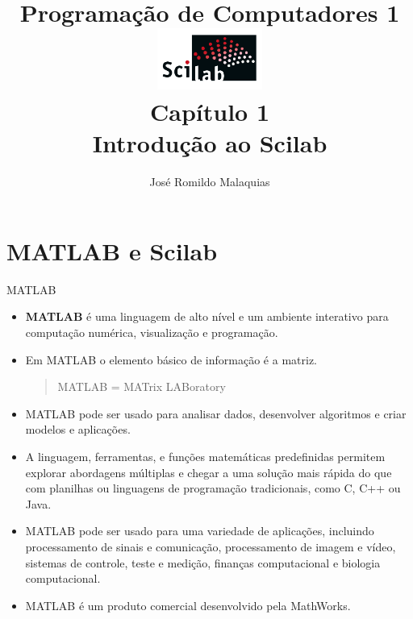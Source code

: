 



\title[PC1-01 Introdução]{
  {\large Programação de Computadores 1}\\[2mm]
  \includegraphics[height=2cm]{images/scilab.png}\\
  {\normalsize Capítulo 1}\\
  Introdução ao Scilab
}
\subject{Programação de Computadores}
\author{José Romildo Malaquias}
\date{\semester}

\frame{\titlepage}

\frame{\tableofcontents}



\section{MATLAB e Scilab}

\begin{frame}[allowframebreaks]{MATLAB}
  \begin{itemize}
    \item \textbf{MATLAB} é uma \alert{linguagem} de alto nível e um
    \alert{ambiente interativo} para computação numérica, visualização e
    programação.
    \item Em MATLAB o elemento básico de informação é a \alert{matriz}.
    \begin{quote}
      MATLAB = MATrix LABoratory
    \end{quote}
    \item MATLAB pode ser usado para analisar dados, desenvolver
    algoritmos e criar modelos e aplicações.
    \item A linguagem, ferramentas, e funções matemáticas predefinidas
    permitem explorar abordagens múltiplas e chegar a uma solução mais
    rápida do que com planilhas ou linguagens de programação
    tradicionais, como C, C++ ou Java.
    \item MATLAB pode ser usado para uma \alert{variedade de
      aplicações}, incluindo processamento de sinais e comunicação,
    processamento de imagem e vídeo, sistemas de controle, teste e
    medição, finanças computacional e biologia computacional.
    \item MATLAB é um \alert{produto comercial} desenvolvido pela
    MathWorks.
  \end{itemize}
\end{frame}

